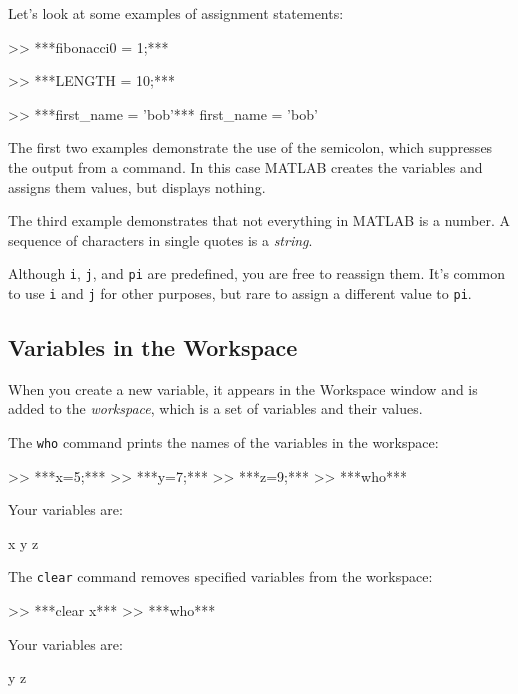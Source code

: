 Let's look at some examples of assignment statements:

\begin{code}
>> ***fibonacci0 = 1;***

>> ***LENGTH = 10;***

>> ***first_name = 'bob'***
first_name = 'bob'
\end{code}

The first two examples demonstrate the use of the semicolon, which
suppresses the output from a command.  In this case MATLAB creates the
variables and assigns them values, but displays nothing.
%
%
%
%

The third example demonstrates that not everything
in MATLAB is a number.
A sequence of characters in single quotes is
a \emph{string}.


Although \lstinline{i}, \lstinline{j}, and \lstinline{pi} are predefined, you are free
to reassign them.  It's common to use \lstinline{i} and \lstinline{j} for other
purposes, but rare to assign a different value to
\lstinline{pi}.



\subsection{Variables in the Workspace}

When you create a new variable, it appears in the Workspace window and is added to the \emph{workspace}, which is a
set of variables and their values.


The \lstinline{who} command prints the
names of the variables in the workspace:


\begin{code}
>> ***x=5;***
>> ***y=7;***
>> ***z=9;***
>> ***who***

Your variables are:

x  y  z
\end{code}

The \lstinline{clear} command removes specified variables from the workspace:

\begin{code}
>> ***clear x***
>> ***who***

Your variables are:

y z
\end{code}


